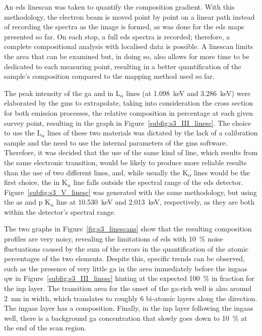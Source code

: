 An \acs{eds} linescan was taken to quantify the composition gradient. With this methodology, the electron beam is moved point by point on a linear path instead of recording the spectra as the image is formed, as was done for the \acs{eds} maps presented so far. On each stop, a full \acs{eds} spectra is recorded; therefore, a complete compositional analysis with localised data is possible. A linescan limits the area that can be examined but, in doing so, also allows for more time to be dedicated to each measuring point, resulting in a better quantification of the sample's composition compared to the mapping method used so far.

The peak intensity of the \acl{ga} and \acl{in} L\(_\alpha\) lines (at \qty{1.098}{\kilo\eV} and \qty{3.286}{\kilo\eV}) were elaborated by the \acf{gms} to extrapolate, taking into consideration the cross section for both emission processes, the relative composition in percentage at each given survey point, resulting in the graph in Figure~\ref{subfig:s3_III_linesc}. The choice to use the L\(_\alpha\) lines of these two materials was dictated by the lack of a calibration sample and the need to use the internal parameters of the \acs{gms} software. Therefore, it was decided that the use of the same kind of line, which results from the same electronic transition, would be likely to produce more reliable results than the use of two different lines, and, while usually the K\(_\alpha\) lines would be the first choice, the \acs{in} K\(_\alpha\) line falls outside the spectral range of the \acs{eds} detector. Figure~\ref{subfig:s3_V_linesc} was generated with the same methodology, but using the \acl{as} and \acl{p} K\(_\alpha\) line at \qty{10.530}{\kilo\eV} and \qty{2.013}{\kilo\eV}, respectively, as they are both within the detector's spectral range.

The two graphs in Figure~\ref{fig:s3_linescans} show that the resulting composition profiles are very noisy, revealing the limitations of \acs{eds} with \qty{10}{\%} noise fluctuations caused by the sum of the errors in the quantification of the atomic percentages of the two elements. Despite this, specific trends can be observed, such as the presence of very little \acl{ga} in the area immediately before the \acs{ingaas} \acl{qw} in Figure~\ref{subfig:s3_III_linesc} hinting at the expected \qty{100}{\%} \acl{in} fraction for the \acs{inp} layer. The transition area for the onset of the \acs{ga}-rich well is also around \qty{2}{nm} in width, which translates to roughly \num{6} bi-atomic layers along the  direction. The \acs{ingaas} layer has a  composition. Finally, in the \acs{inp} layer following the \acs{ingaas} well, there is a background \acl{ga} concentration that slowly goes down to \qty{10}{\%} at the end of the scan region.

